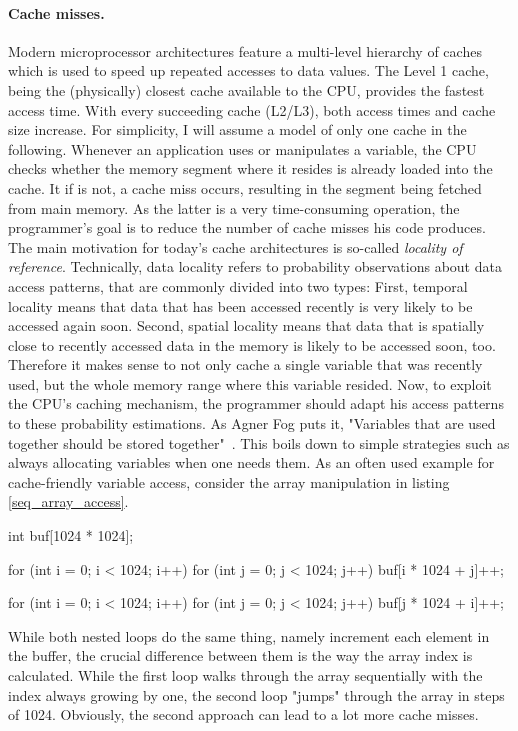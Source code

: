 \paragraph{Cache misses.} Modern microprocessor architectures feature a multi-level hierarchy of caches which is used to speed up repeated accesses to data values. The Level 1 cache, being the (physically) closest cache available to the CPU, provides the fastest access time. With every succeeding cache (L2/L3), both access times and cache size increase. For simplicity, I will assume a model of only one cache in the following. Whenever an application uses or manipulates a variable, the CPU checks whether the memory segment where it resides is already loaded into the cache. It if is not, a cache miss occurs, resulting in the segment being fetched from main memory. As the latter is a very time-consuming operation, the programmer's goal is to reduce the number of cache misses his code produces. The main motivation for today's cache architectures is so-called \emph{locality of reference}. Technically, data locality refers to probability observations about data access patterns, that are commonly divided into two types: First, temporal locality means that data that has been accessed recently is very likely to be accessed again soon. Second, spatial locality means that data that is spatially close to recently accessed data in the memory is likely to be accessed soon, too. Therefore it makes sense to not only cache a single variable that was recently used, but the whole memory range where this variable resided. Now, to exploit the CPU's caching mechanism, the programmer should adapt his access patterns to these probability estimations. As Agner Fog puts it, "Variables that are used together should be stored together"~\cite[p. 88]{fog2011optimizing}. This boils down to simple strategies such as always allocating variables when one needs them. As an often used example for cache-friendly variable access, consider the array manipulation in listing \ref{seq_array_access}.
\begin{code}[caption={Sequential vs. non-sequential array access}, label=seq_array_access]
int buf[1024 * 1024];

for (int i = 0; i < 1024; i++)
  for (int j = 0; j < 1024; j++)
    buf[i * 1024 + j]++;

for (int i = 0; i < 1024; i++)
  for (int j = 0; j < 1024; j++)
    buf[j * 1024 + i]++;
\end{code}

While both nested loops do the same thing, namely increment each element in the buffer, the crucial difference between them is the way the array index is calculated. While the first loop walks through the array sequentially with the index always growing by one, the second loop "jumps" through the array in steps of 1024. Obviously, the second approach can lead to a lot more cache misses.

